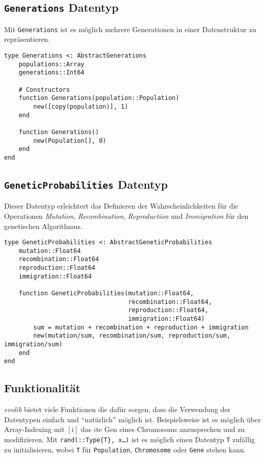 \subsection{\texttt{Generations} Datentyp}
Mit \texttt{Generations} ist es möglich mehrere Generationen in einer Datenstruktur zu repräsentieren. 
\begin{Verbatim}
type Generations <: AbstractGenerations
    populations::Array
    generations::Int64

    # Constructors
    function Generations(population::Population)
        new([copy(population)], 1)
    end

    function Generations()
        new(Population[], 0)
    end
end
\end{Verbatim}

\subsection{\texttt{GeneticProbabilities} Datentyp}
Dieser Datentyp erleichtert das Definieren der Wahrscheinlichkeiten für die Operationen \textit{Mutation}, \textit{Recombination}, \textit{Reproduction} und \textit{Immigration} für den genetischen Algorithmus.

\begin{Verbatim}
type GeneticProbabilities <: AbstractGeneticProbabilities
    mutation::Float64
    recombination::Float64
    reproduction::Float64
    immigration::Float64

    function GeneticProbabilities(mutation::Float64, 
                                  recombination::Float64,
                                  reproduction::Float64,
                                  immigration::Float64)
        sum = mutation + recombination + reproduction + immigration
        new(mutation/sum, recombination/sum, reproduction/sum, immigration/sum)
    end
end
\end{Verbatim}

\subsection{Funktionalität}

\textit{evolib} bietet viele Funktionen die dafür sorgen, dass die Verwendung der Datentypen einfach und ``natürlich'' möglich ist. 
Beispielsweise ist es möglich über Array-Indexing mit $\left[\mathrm{i}\right]$ das $i$te Gen eines Chromosoms anzusprechen und zu modifizieren.
Mit \texttt{rand(::Type\{T\}, x\ldots)} ist es möglich einen Datentyp \texttt{T} zufällig zu initialisieren, wobei \texttt{T} für \texttt{Population}, \texttt{Chromosome} oder \texttt{Gene} stehen kann.

